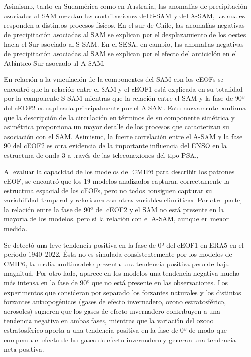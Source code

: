 \documentclass[12pt,oneside,a4paper]{reedthesis}
\begin{document}
Asimismo, tanto en Sudamérica como en Australia, las anomalías de precipitación asociadas al SAM mezclan las contribuciones del S-SAM y del A-SAM, las cuales responden a distintos procesos físicos.
En el sur de Chile, las anomalías negativas de precipitación asociadas al SAM se explican por el desplazamiento de los oestes hacia el Sur asociado al S-SAM.
En el SESA, en cambio, las anomalías negativas de precipitación asociadas al SAM se explican por el efecto del anticiclón en el Atlántico Sur asociado al A-SAM.~

En relación a la vinculación de la componentes del SAM con los cEOFs se encontró que la relación entre el SAM y el cEOF1 está explicada en su totalidad por la componente S-SAM mientras que la relación entre el SAM y la fase de 90º del cEOF2 es explicada principalmente por el A-SAM.
Esto nuevamente confirma que la descripción de la circulación en términos de su componente simétrica y asimétrica proporciona un mayor detalle de los procesos que caracterizan su asociación con el SAM.
Asimismo, la fuerte correlación entre el A-SAM y la fase 90 del cEOF2 es otra evidencia de la importante influencia del ENSO en la estructura de onda 3 a través de las teleconexiones del tipo PSA.,

Al evaluar la capacidad de los modelos del CMIP6 para describir los patrones cEOF, se encontró que los 19 modelos analizados capturan correctamente la estructura espacial de los cEOFs, pero no todos consiguen capturar su variabilidad temporal y relaciones con otras variables climáticas.
Por otra parte, la relación entre la fase de 90º del cEOF2 y el SAM no está presente en la mayoría de los modelos, pero sí la relación con el A-SAM, aunque en menor medida.

Se detectó una leve tendencia positiva en la fase de 0º del cEOF1 en ERA5 en el período 1940--2022.
Ésta no es simulada consistentemente por los modelos de CMIP6; la media multimodelo presenta una tendencia positiva pero de baja magnitud.
Por otro lado, aparece en los modelos una tendencia negativa mucho más intensa en la fase de 90º que no está presente en las observaciones.
Los experimentos que consideran por separado los forzantes naturales y los distintos forzantes antropogénicos (gases de efecto invernadero, ozono estratosférico, aerosoles) sugieren que los gases de efecto invernadero contribuyen a una tendencia negativa en ambas fases, mientras que la variación del ozono estratosférico aporta a una tendencia positiva en la fase de 0º de modo que compensa el efecto de los gases de efecto invernadero y generan una tendencia neta positiva.
\end{document}
